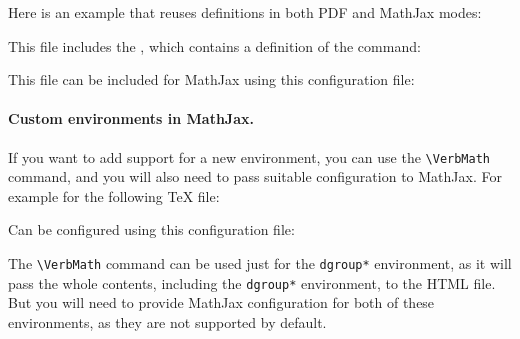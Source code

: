 Here is an example that reuses definitions in both PDF and MathJax modes:


This file includes the , which contains a definition of the  command:

\begin{texsource}
\newcommand\myspace{\quad}
\end{texsource}

This file can be included for MathJax using this configuration file:

\begin{texsource}

\EndPreamble
\end{texsource}





\paragraph{Custom environments in MathJax.}\label{sec:mathjax_env}

If you want to add support for a new environment, you can use the \verb|\VerbMath| command, and you will
also need to pass suitable configuration to MathJax. For example for the following TeX file:


Can be configured using this configuration file:

\begin{texsource}
 
\EndPreamble
\end{texsource}

The \verb|\VerbMath| command can be used just for the \verb|dgroup*| environment, as it will pass the
whole contents, including the \verb|dgroup*| environment, to the HTML file. But you will need to 
provide MathJax configuration for both of these environments, as they are not supported by default.



